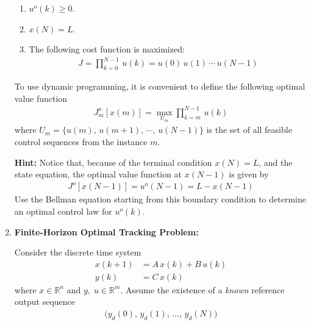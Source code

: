 \documentclass[letterpaper,12pt]{article}
\begin{document}
\begin{enumerate}
\begin{enumerate}
    \item
    $u^o(k) \ge 0$.

    \item
    $x(N) = L$.

    \item
    The following cost function is maximized:
    \begin{align*}
        J  = \prod_{k=0}^{N-1}\, u (k) = u (0) \,u (1) \,\cdots \, u(N-1)
    \end{align*}
\end{enumerate}

To use dynamic programming, it is convenient to define the following optimal value function
\begin{align*}
    J_m^o[x(m)]  = \max_{U_m} \prod_{k=m}^{N-1}\, u(k)
\end{align*}
where $U_m  = \{ u(m),\,u(m+1),\,\cdots,\, u(N-1)\}$ is the set of all  feasible control sequences from the instance $m$.

\textbf{Hint:} Notice that, because of the terminal condition $x(N) = L$, and the state equation, the optimal value function at $x(N-1)$ is given by
\begin{align*}
    J^o[x(N-1)] = u^o(N-1) = L - x(N-1)
\end{align*}
Use the Bellman equation starting from this boundary condition to determine an optimal control law for $u^o(k)$.


\item
{\bf Finite-Horizon Optimal Tracking Problem:}

Consider the discrete time system
\begin{align*}
    x(k+1) & = A\, x(k) + B \, u(k) \\
    y(k) & = C\, x(k)
\end{align*}
where $x \in \mathbb{R}^n$ and $y, \;u \in \mathbb{R}^m$.
Assume the existence of a {\em known} reference output sequence
\begin{align*}
    \big( y_d(0),\, y_d(1),\, \ldots,\, y_d(N) \big)
\end{align*}


\end{enumerate}
\end{document}
